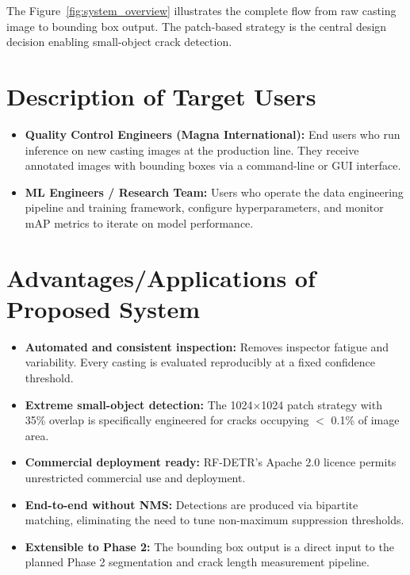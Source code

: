 The Figure~\ref{fig:system_overview} illustrates the complete flow from raw casting image to bounding box output. The patch-based strategy is the central design decision enabling small-object crack detection.

\section{Description of Target Users }
\justify

\begin{itemize}[leftmargin=2em]
    \item \textbf{Quality Control Engineers (Magna International):} End users who run inference on new casting images at the production line. They receive annotated images with bounding boxes via a command-line or GUI interface.
    \item \textbf{ML Engineers / Research Team:} Users who operate the data engineering pipeline and training framework, configure hyperparameters, and monitor mAP metrics to iterate on model performance.
\end{itemize}

\section{Advantages/Applications  of Proposed System}
\justify

\begin{itemize}[leftmargin=2em]
    \item \textbf{Automated and consistent inspection:} Removes inspector fatigue and variability. Every casting is evaluated reproducibly at a fixed confidence threshold.
    \item \textbf{Extreme small-object detection:} The 1024$\times$1024 patch strategy with 35\% overlap is specifically engineered for cracks occupying $<$ 0.1\% of image area.
    \item \textbf{Commercial deployment ready:} RF-DETR's Apache 2.0 licence permits unrestricted commercial use and deployment.
    \item \textbf{End-to-end without NMS:} Detections are produced via bipartite matching, eliminating the need to tune non-maximum suppression thresholds.
    \item \textbf{Extensible to Phase 2:} The bounding box output is a direct input to the planned Phase 2 segmentation and crack length measurement pipeline.
\end{itemize}

